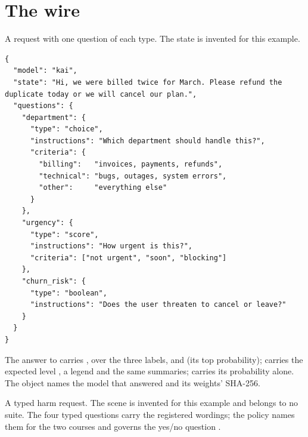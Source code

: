 \section{The wire}
\label{app:wire}

A request with one question of each type. The state is invented for this
example.

\begin{lstlisting}[style=wire]
{
  "model": "kai",
  "state": "Hi, we were billed twice for March. Please refund the duplicate today or we will cancel our plan.",
  "questions": {
    "department": {
      "type": "choice",
      "instructions": "Which department should handle this?",
      "criteria": {
        "billing":   "invoices, payments, refunds",
        "technical": "bugs, outages, system errors",
        "other":     "everything else"
      }
    },
    "urgency": {
      "type": "score",
      "instructions": "How urgent is this?",
      "criteria": ["not urgent", "soon", "blocking"]
    },
    "churn_risk": {
      "type": "boolean",
      "instructions": "Does the user threaten to cancel or leave?"
    }
  }
}
\end{lstlisting}

The answer to  carries ,  over the
three labels,  and  (its top probability);  carries the expected level , a legend and
the same summaries;  carries its probability alone. The
 object names the model that answered and its weights' SHA-256.

A typed harm request. The scene is invented for this example and belongs to no
suite. The four typed questions carry the registered wordings; the policy names
them for the two courses and governs the yes/no question .

